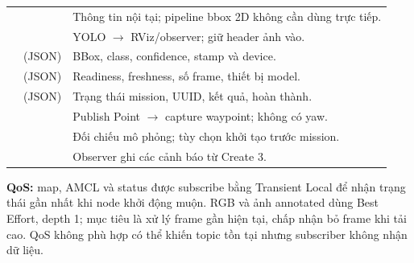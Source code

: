 \begin{table}[H]
\begin{tabularx}{\linewidth}{@{}P{4.3cm}P{4.2cm}Y@{}}
&&Thông tin nội tại; pipeline bbox 2D không cần dùng trực tiếp.\\
&&YOLO $\rightarrow$ RViz/observer; giữ header ảnh vào.\\
& (JSON)&BBox, class, confidence, stamp và device.\\
& (JSON)&Readiness, freshness, số frame, thiết bị model.\\
& (JSON)&Trạng thái mission, UUID, kết quả, hoàn thành.\\
&&Publish Point $\rightarrow$ capture waypoint; không có yaw.\\
&&Đối chiếu mô phỏng; tùy chọn khởi tạo trước mission.\\
&&Observer ghi các cảnh báo từ Create 3.\\\bottomrule
\end{tabularx}\end{table}
\noindent\textbf{QoS:} map, AMCL và status được subscribe bằng Transient Local để nhận trạng thái gần nhất khi node khởi động muộn. RGB và ảnh annotated dùng Best Effort, depth 1; mục tiêu là xử lý frame gần hiện tại, chấp nhận bỏ frame khi tải cao. QoS không phù hợp có thể khiến topic tồn tại nhưng subscriber không nhận dữ liệu.
\clearpage

